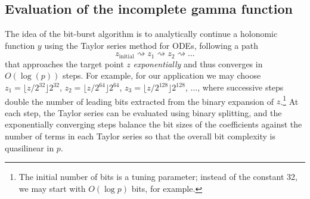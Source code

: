 \documentclass[reqno]{amsart}
\newcommand{\RR}{\mathbb{R}}
\newcommand{\be}{\begin{equation}}
\newcommand{\ee}{\end{equation}}
\newtheorem{lemma}[theorem]{Lemma}
\theoremstyle{definition}
\begin{document}



\subsection{Evaluation of the incomplete gamma function}

The idea of the bit-burst algorithm is to analytically
continue a holonomic function $y$ using the Taylor series method for
ODEs, following a path
\be
z_{\text{initial}} \rightsquigarrow z_1 \rightsquigarrow z_2 \rightsquigarrow \ldots
\ee
that approaches the target point $z$ \emph{exponentially} and thus converges
in $O(\log(p))$ steps.
For example, for our application we may choose
$z_1 = \lfloor z / 2^{32}\rfloor 2^{32}$,
$z_2 = \lfloor z / 2^{64}\rfloor 2^{64}$,
$z_3 = \lfloor z / 2^{128}\rfloor 2^{128}$,
$\ldots$, where successive steps double the number
of leading bits extracted from the binary expansion of $z$.\footnote{The initial number of bits
is a tuning parameter; instead of the constant 32,
we may start with $O(\log p)$ bits, for example.}
At each step, the Taylor series can be evaluated using binary splitting,
and the exponentially converging steps balance the bit sizes of the coefficients
against the number of terms in each Taylor series so that the
overall bit complexity is quasilinear in $p$.
\end{document}
